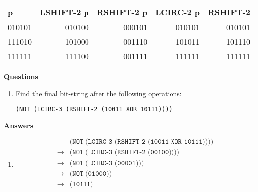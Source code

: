 \documentclass[12pt,letterpaper]{article}
\begin{document}
\begin{center}
  \begin{tabular}{| l || r | r | r | r |}
    \hline
    p & \textbf{LSHIFT-2} p & \textbf{RSHIFT-2} p & \textbf{LCIRC-2} p & \textbf{RSHIFT-2} \\
    \hline \hline
    010101 & 010100 & 000101 & 010101 & 010101 \\
    111010 & 101000 & 001110 & 101011 & 101110 \\
    111111 & 111100 & 001111 & 111111 & 111111 \\
    \hline
  \end{tabular}
\end{center}

\bigskip
\noindent \textbf{Questions}
\begin{enumerate}
\item Find the final bit-string after the following operations:
  
  \texttt{(NOT (LCIRC-3 (RSHIFT-2 (10011 XOR 10111))))}

\end{enumerate}

\pagebreak
\noindent \textbf{Answers}

\begin{enumerate}

\item \begin{align*}
  & \texttt{(NOT (LCIRC-3 (RSHIFT-2 (10011 XOR 10111))))} \\
  \rightarrow& \texttt{(NOT (LCIRC-3 (RSHIFT-2 (00100))))} \\
  \rightarrow& \texttt{(NOT (LCIRC-3 (00001)))} \\
  \rightarrow& \texttt{(NOT (01000))} \\
  \rightarrow& \texttt{(10111)} \\
\end{align*}

\end{enumerate}
\end{document}
